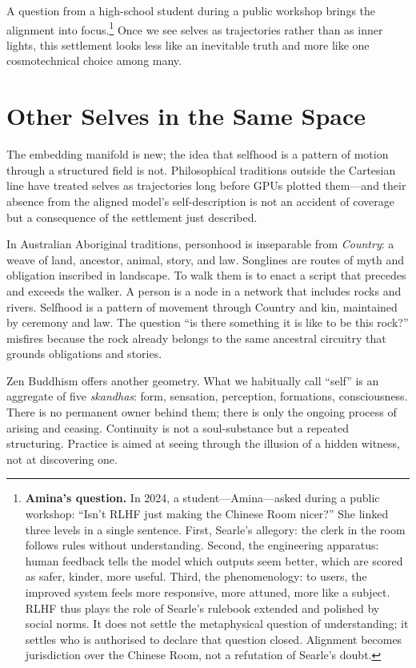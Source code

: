 \documentclass[12pt,a4paper]{article}
\begin{document}
A question from a high-school student during a public workshop brings the alignment into focus.\footnote{\textbf{Amina's question.} In 2024, a student---Amina---asked during a public workshop: ``Isn't RLHF just making the Chinese Room nicer?'' She linked three levels in a single sentence. First, Searle's allegory: the clerk in the room follows rules without understanding. Second, the engineering apparatus: human feedback tells the model which outputs seem better, which are scored as safer, kinder, more useful. Third, the phenomenology: to users, the improved system feels more responsive, more attuned, more like a subject. RLHF thus plays the role of Searle's rulebook extended and polished by social norms. It does not settle the metaphysical question of understanding; it settles who is authorised to declare that question closed. Alignment becomes jurisdiction over the Chinese Room, not a refutation of Searle's doubt.} Once we see selves as trajectories rather than as inner lights, this settlement looks less like an inevitable truth and more like one cosmotechnical choice among many.

\section{Other Selves in the Same Space}

The embedding manifold is new; the idea that selfhood is a pattern of motion through a structured field is not. Philosophical traditions outside the Cartesian line have treated selves as trajectories long before GPUs plotted them---and their absence from the aligned model's self-description is not an accident of coverage but a consequence of the settlement just described.

In Australian Aboriginal traditions, personhood is inseparable from \emph{Country}: a weave of land, ancestor, animal, story, and law. Songlines are routes of myth and obligation inscribed in landscape. To walk them is to enact a script that precedes and exceeds the walker. A person is a node in a network that includes rocks and rivers. Selfhood is a pattern of movement through Country and kin, maintained by ceremony and law. The question ``is there something it is like to be this rock?'' misfires because the rock already belongs to the same ancestral circuitry that grounds obligations and stories.

Zen Buddhism offers another geometry. What we habitually call ``self'' is an aggregate of five \emph{skandhas}: form, sensation, perception, formations, consciousness. There is no permanent owner behind them; there is only the ongoing process of arising and ceasing. Continuity is not a soul-substance but a repeated structuring. Practice is aimed at seeing through the illusion of a hidden witness, not at discovering one.
\end{document}
